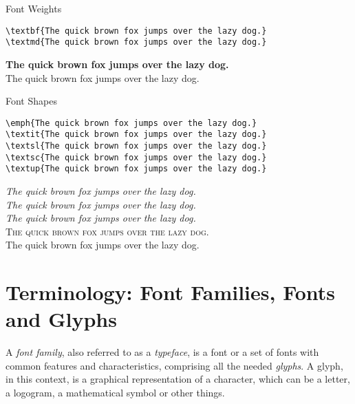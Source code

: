 \documentclass[a4paper,oneside,11pt]{article}
\begin{document}
\begin{titled-frame}
{\textsf{Font Weights}}
\vspace{-1em}
\begin{verbatim}
\textbf{The quick brown fox jumps over the lazy dog.}
\textmd{The quick brown fox jumps over the lazy dog.}
\end{verbatim}
\textbf{The quick brown fox jumps over the lazy dog.}\\
\textmd{The quick brown fox jumps over the lazy dog.}
\end{titled-frame}

\begin{titled-frame}
{\textsf{Font Shapes}}
\vspace{-1em}
\begin{verbatim}
\emph{The quick brown fox jumps over the lazy dog.}
\textit{The quick brown fox jumps over the lazy dog.}
\textsl{The quick brown fox jumps over the lazy dog.}
\textsc{The quick brown fox jumps over the lazy dog.}
\textup{The quick brown fox jumps over the lazy dog.}
\end{verbatim}
\emph{The quick brown fox jumps over the lazy dog.}\\
\textit{The quick brown fox jumps over the lazy dog.}\\
\textsl{The quick brown fox jumps over the lazy dog.}\\
\textsc{The quick brown fox jumps over the lazy dog.}\\
\textup{The quick brown fox jumps over the lazy dog.}
\end{titled-frame}


\newpage
\section{Terminology: Font Families, Fonts and Glyphs}
\label{sec:font-families}

A \emph{font family},  also referred to as  a \emph{typeface}, is a  font or a
set  of fonts  with common  features and  characteristics, comprising  all the
needed \emph{glyphs}. A glyph, in this  context, is a graphical representation
of a character,  which can be a  letter, a logogram, a  mathematical symbol or
other things\footnotemark.

\end{document}
